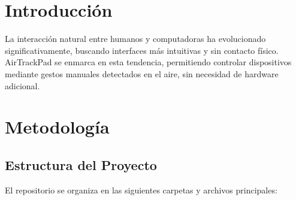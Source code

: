 \documentclass[a4paper,12pt]{article}
\newcommand{\vacio}{\textcolor{white}{ .}}
\begin{document}
{%

\renewcommand{\headrulewidth}{0.5pt}


\pagestyle{fancy}
\renewcommand{\footrulewidth}{0.5pt}
\fancyfoot[C]{\vacio}

\newpage

\renewcommand{\contentsname}{Índice}
\tableofcontents
{}

\newpage

\section{Introducción}
La interacción natural entre humanos y computadoras ha evolucionado significativamente, buscando interfaces más intuitivas y sin contacto físico. AirTrackPad se enmarca en esta tendencia, permitiendo controlar dispositivos mediante gestos manuales detectados en el aire, sin necesidad de hardware adicional.

\section{Metodología}

\subsection{Estructura del Proyecto}
El repositorio se organiza en las siguientes carpetas y archivos principales:

}
\end{document}
